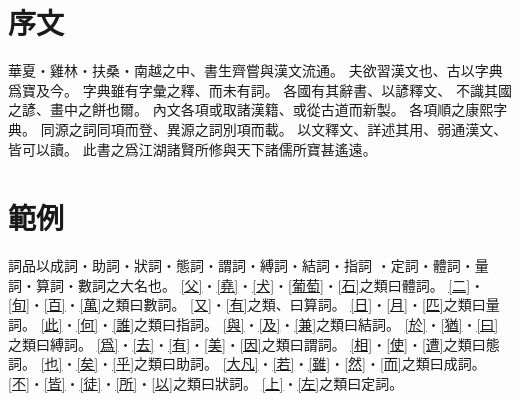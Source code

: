 \chapter*{序文}
華夏・雞林・扶桑・南越之中、書生齊嘗與漢文流通。
夫欲習漢文也、古以字典爲寶及今。
字典雖有字彙之釋、而未有詞。
各國有其辭書、以諺釋文、
不識其國之諺、畫中之餅也爾。
內文各項或取諸漢籍、或從古道而新製。
各項順之康熙字典。
同源之詞同項而登、異源之詞別項而載。
以文釋文、詳述其用、弱通漢文、皆可以讀。
此書之爲江湖諸賢所修與天下諸儒所寶甚遙遠。
\chapter*{範例}
詞品以成詞・助詞・狀詞・態詞・謂詞・縛詞・結詞・指詞
・定詞・體詞・量詞・算詞・數詞之大名也。
\cref{父}・\cref{堯}・\cref{犬}・\cref{葡萄}・\cref{石}之類曰體詞。
\cref{二}・\cref{旬}・\cref{百}・\cref{萬}之類曰數詞。
\cref{又}・\cref{有}之類、曰算詞。
\cref{日}・\cref{月}・\cref{匹}之類曰量詞。
\cref{此}・\cref{何}・\cref{誰}之類曰指詞。
\cref{與}・\cref{及}・\cref{兼}之類曰結詞。
\cref{於}・\cref{猶}・\cref{曰}之類曰縛詞。
\cref{爲}・\cref{去}・\cref{有}・\cref{美}・\cref{因}之類曰謂詞。
\cref{相}・\cref{使}・\cref{遭}之類曰態詞。
\cref{也}・\cref{矣}・\cref{乎}之類曰助詞。
\cref{大凡}・\cref{若}・\cref{雖}・\cref{然}・\cref{而}之類曰成詞。
\cref{不}・\cref{皆}・\cref{徒}・\cref{所}・\cref{以}之類曰狀詞。
\cref{上}・\cref{左}之類曰定詞。
